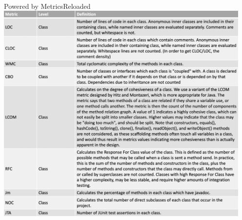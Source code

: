 \documentclass{article}
\begin{document}
\begin{thebibliography}{}  
 
     \\
        Powered by MetricsReloaded\\
        \includegraphics[width=0.95\textwidth]{Defi.png}
        
 
\end{thebibliography}
\end{document}
